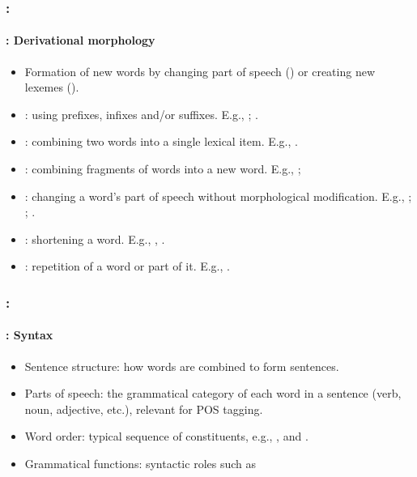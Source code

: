 \documentclass[xcolor=table]{beamer}
\begin{document}
\begin{frame}
	\frametitle{\insertshortsubtitle: \insertsection}
	\framesubtitle{\insertsubsection: Derivational morphology}
	\small\vspace{-3pt}
	\begin{itemize}
		\item Formation of new words by changing part of speech () or creating new lexemes (). 
		\item {}: using prefixes, infixes and/or suffixes. 
		E.g., ; .
		
		\item {}: combining two words into a single lexical item.
		E.g., .
		
		\item {}: combining fragments of words into a new word.
		E.g., ; 
		
		\item {}: changing a word's part of speech without morphological modification.
		E.g., ; ; .
		
		\item {}: shortening a word.
		E.g., , .
		
		\item {}: repetition of a word or part of it.
		E.g., .
		
	\end{itemize}

\end{frame}

\begin{frame}
	\frametitle{\insertshortsubtitle: \insertsection}
	\framesubtitle{\insertsubsection: Syntax}

	\begin{itemize}
		\item Sentence structure: how words are combined to form sentences.
		\item Parts of speech: the grammatical category of each word in a sentence (verb, noun, adjective, etc.), relevant for POS tagging.
		\item Word order: typical sequence of constituents, e.g., ,  and . 
		\item Grammatical functions: syntactic roles such as  
	\end{itemize}

\end{frame}
\end{document}
